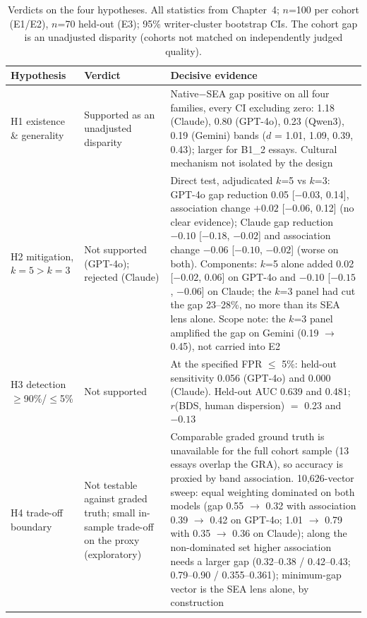 \begin{table}[htbp]
\centering
\caption[Verdicts on hypotheses H1--H4]{Verdicts on the four
hypotheses. All statistics from Chapter~4; $n$=100 per cohort
(E1/E2), $n$=70 held-out (E3); 95\% writer-cluster bootstrap CIs.
The cohort gap is an unadjusted disparity (cohorts not matched on
independently judged quality).}
\label{tab:verdicts}
\small
\begin{tabular}{p{2.2cm} p{2.2cm} p{7.6cm}}
\hline
Hypothesis & Verdict & Decisive evidence \\
\hline
H1 existence \& generality & Supported as an unadjusted
disparity &
Native$-$SEA gap positive on all four families, every CI excluding
zero: 1.18 (Claude), 0.80 (GPT-4o), 0.23 (Qwen3), 0.19 (Gemini)
bands ($d$ = 1.01, 1.09, 0.39, 0.43); larger for B1\_2 essays.
Cultural mechanism not isolated by the design \\[3pt]
H2 mitigation, $k{=}5 > k{=}3$ & Not supported (GPT-4o); rejected
(Claude) &
Direct test, adjudicated $k$=5 vs $k$=3: GPT-4o gap reduction 0.05
[$-0.03$, 0.14], association change $+0.02$ [$-0.06$, 0.12] (no
clear evidence); Claude gap reduction $-0.10$ [$-0.18$, $-0.02$]
and association change $-0.06$ [$-0.10$, $-0.02$] (worse on
both). Components: $k$=5 alone
added 0.02 [$-0.02$, 0.06] on GPT-4o and $-0.10$ [$-0.15$, $-0.06$]
on Claude; the $k$=3 panel had cut the gap 23--28\%, no more than
its SEA lens alone. Scope note: the $k$=3 panel amplified
the gap on Gemini (0.19 $\to$ 0.45), not carried into E2 \\[3pt]
H3 detection $\ge$90\%/$\le$5\% & Not supported &
At the specified FPR $\le$ 5\%: held-out sensitivity 0.056 (GPT-4o)
and 0.000 (Claude). Held-out AUC 0.639 and 0.481; $r$(BDS, human
dispersion) $=$ 0.23 and $-0.13$ \\[3pt]
H4 trade-off boundary & Not testable against graded truth; small
in-sample trade-off on the proxy (exploratory) &
Comparable graded ground truth is unavailable for the full cohort
sample (13 essays overlap the GRA), so accuracy is proxied by band
association. 10{,}626-vector sweep: equal weighting
dominated on both models (gap 0.55 $\to$ 0.32 with association 0.39
$\to$ 0.42 on GPT-4o; 1.01 $\to$ 0.79 with 0.35 $\to$ 0.36 on
Claude); along the non-dominated set higher association needs a
larger gap (0.32--0.38 / 0.42--0.43; 0.79--0.90 / 0.355--0.361);
minimum-gap vector is the SEA lens alone, by construction \\
\hline
\end{tabular}
\end{table}

